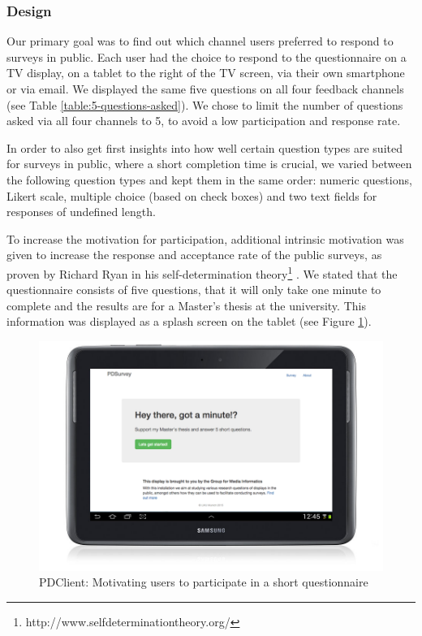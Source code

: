 	\subsubsection{Design}
	\label{chapter:field-study:design}


	Our primary goal was to find out which channel users preferred to respond to surveys in public. Each user had the choice to respond to the questionnaire on a TV display, on a tablet to the right of the TV screen, via their own smartphone or via email. We displayed the same five questions on all four feedback channels (see Table \ref{table:5-questions-asked}). We chose to limit the number of questions asked via all four channels to 5, to avoid a low participation and response rate. 

	


	In order to also get first insights into how well certain question types are suited for surveys in public, where a short completion time is crucial, we varied between the following question types and kept them in the same order: numeric questions, Likert scale, multiple choice (based on check boxes) and two text fields for responses of undefined length. 

	To increase the motivation for participation, additional intrinsic motivation was given to increase the response and acceptance rate of the public surveys, as proven by Richard Ryan in his self-determination theory\footnote{http://www.selfdeterminationtheory.org/} \cite{ryan2000self}. We stated that the questionnaire consists of five questions, that it will only take one minute to complete and the results are for a Master's thesis at the university. This information was displayed as a splash screen on the tablet (see Figure \ref{fig:5-pdclient-intro}).

	\begin{figure}
	    \begin{center}
	        \includegraphics[width=.7\columnwidth]{img/5_field-study/pdclient-startscreen.png}
	    \end{center}
	 \caption{PDClient: Motivating users to participate in a short questionnaire}
	 \label{fig:5-pdclient-intro}
	\end{figure}

